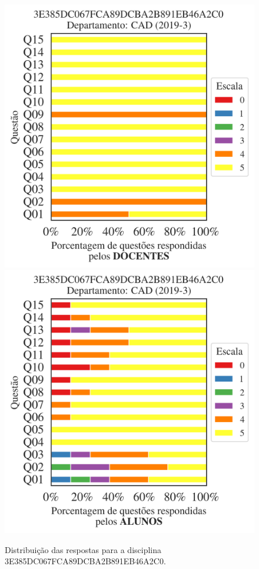 \documentclass[a4paper,10pt]{article}
\begin{document}
\begin{figure}[h]
\centering
\includegraphics[width=0.485\linewidth]{analise_disciplina_departamento_CAD_3E385DC067FCA89DCBA2B891EB46A2C0_docentes.png}
\includegraphics[width=0.485\linewidth]{analise_disciplina_departamento_CAD_3E385DC067FCA89DCBA2B891EB46A2C0_alunos.png}
\caption{\label{fig:analise_geral_departamento}                Distribuição das respostas para a disciplina 3E385DC067FCA89DCBA2B891EB46A2C0. }
\end{figure}
\end{document}
